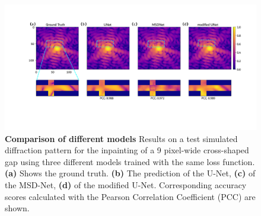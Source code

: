 \begin{figure}[h]
    \includegraphics[width=\textwidth]{figures/Inpainting/model_comparison.pdf}
    \caption{\textbf{Comparison of different models} Results on a test simulated diffraction pattern for the inpainting 
    of a 9 pixel-wide cross-shaped gap using three different models trained with the same loss function.
    \textbf{(a)} Shows the ground truth. \textbf{(b)} The prediction of the U-Net, \textbf{(c)} 
     of the MSD-Net, \textbf{(d)} of the modified U-Net. Corresponding accuracy scores calculated with the Pearson Correlation 
    Coefficient (PCC) are shown.}
    \label{fig:models_comparison}
\end{figure}



